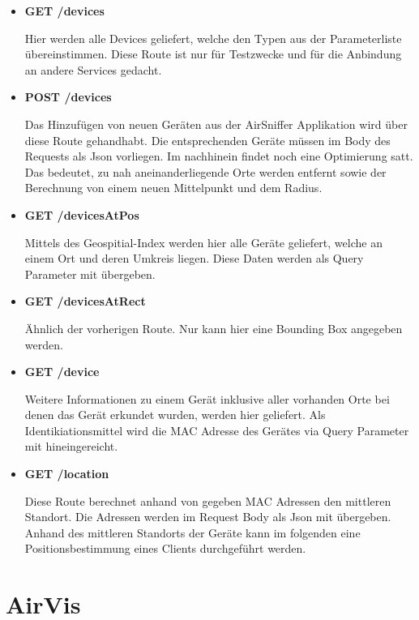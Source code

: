 \documentclass[11pt,a4paper]{article}
\begin{document}
\begin{itemize}
\item{} \textbf{GET /devices}

Hier werden alle Devices geliefert, welche den Typen aus der Parameterliste übereinstimmen. Diese Route ist nur für Testzwecke und für die Anbindung an andere Services gedacht. 

\item{} \textbf{POST /devices}

Das Hinzufügen von neuen Geräten aus der AirSniffer Applikation wird über diese Route gehandhabt. Die entsprechenden Geräte müssen im Body des Requests als Json vorliegen. Im nachhinein findet noch eine Optimierung satt. Das bedeutet, zu nah aneinanderliegende Orte werden entfernt sowie der Berechnung von einem neuen Mittelpunkt und dem Radius.

\item{} \textbf{GET /devicesAtPos}

Mittels des Geospitial-Index werden hier alle Geräte geliefert, welche an einem Ort und deren Umkreis liegen. Diese Daten werden als Query Parameter mit übergeben.

\item{} \textbf{GET /devicesAtRect}

Ähnlich der vorherigen Route. Nur kann hier eine Bounding Box angegeben werden.

\item{} \textbf{GET /device}

Weitere Informationen zu einem Gerät inklusive aller vorhanden Orte bei denen das Gerät erkundet wurden, werden hier geliefert. Als Identikiationsmittel wird die MAC Adresse des Gerätes via Query Parameter mit hineingereicht.

\item{} \textbf{GET /location}

Diese Route berechnet anhand von gegeben MAC Adressen den mittleren Standort. Die Adressen werden im Request Body als Json mit übergeben. Anhand des mittleren Standorts der Geräte kann im folgenden eine Positionsbestimmung eines Clients durchgeführt werden.

\end{itemize}


\section{AirVis}
\end{document}
